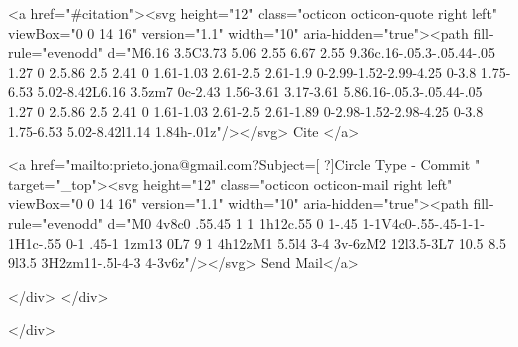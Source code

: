       <a  href="#citation"><svg height="12" class="octicon octicon-quote right left" viewBox="0 0 14 16" version="1.1" width="10" aria-hidden="true"><path fill-rule="evenodd" d="M6.16 3.5C3.73 5.06 2.55 6.67 2.55 9.36c.16-.05.3-.05.44-.05 1.27 0 2.5.86 2.5 2.41 0 1.61-1.03 2.61-2.5 2.61-1.9 0-2.99-1.52-2.99-4.25 0-3.8 1.75-6.53 5.02-8.42L6.16 3.5zm7 0c-2.43 1.56-3.61 3.17-3.61 5.86.16-.05.3-.05.44-.05 1.27 0 2.5.86 2.5 2.41 0 1.61-1.03 2.61-2.5 2.61-1.89 0-2.98-1.52-2.98-4.25 0-3.8 1.75-6.53 5.02-8.42l1.14 1.84h-.01z"/></svg> Cite
      </a>

      <a href="mailto:prieto.jona@gmail.com?Subject=[ ?]Circle Type - Commit " target="_top"><svg height="12" class="octicon octicon-mail right left" viewBox="0 0 14 16" version="1.1" width="10" aria-hidden="true"><path fill-rule="evenodd" d="M0 4v8c0 .55.45 1 1 1h12c.55 0 1-.45 1-1V4c0-.55-.45-1-1-1H1c-.55 0-1 .45-1 1zm13 0L7 9 1 4h12zM1 5.5l4 3-4 3v-6zM2 12l3.5-3L7 10.5 8.5 9l3.5 3H2zm11-.5l-4-3 4-3v6z"/></svg> Send Mail</a>

    </div>
  </div>

</div>




